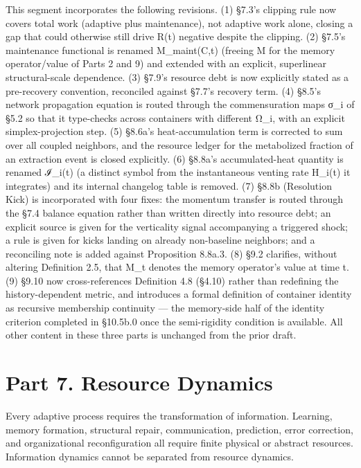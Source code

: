 \documentclass[
]{article}
\begin{document}
This segment incorporates the following revisions. (1) §7.3's clipping
rule now covers total work (adaptive plus maintenance), not adaptive
work alone, closing a gap that could otherwise still drive R(t) negative
despite the clipping. (2) §7.5's maintenance functional is renamed
M\_maint(C,t) (freeing M for the memory operator/value of Parts 2 and 9)
and extended with an explicit, superlinear structural-scale dependence.
(3) §7.9's resource debt is now explicitly stated as a pre-recovery
convention, reconciled against §7.7's recovery term. (4) §8.5's network
propagation equation is routed through the commensuration maps σ\_i of
§5.2 so that it type-checks across containers with different Ω\_i, with
an explicit simplex-projection step. (5) §8.6a's heat-accumulation term
is corrected to sum over all coupled neighbors, and the resource ledger
for the metabolized fraction of an extraction event is closed
explicitly. (6) §8.8a's accumulated-heat quantity is renamed ℐ\_i(t) (a
distinct symbol from the instantaneous venting rate H\_i(t) it
integrates) and its internal changelog table is removed. (7) §8.8b
(Resolution Kick) is incorporated with four fixes: the momentum transfer
is routed through the §7.4 balance equation rather than written directly
into resource debt; an explicit source is given for the verticality
signal accompanying a triggered shock; a rule is given for kicks landing
on already non-baseline neighbors; and a reconciling note is added
against Proposition 8.8a.3. (8) §9.2 clarifies, without altering
Definition 2.5, that M\_t denotes the memory operator's value at time t.
(9) §9.10 now cross-references Definition 4.8 (§4.10) rather than
redefining the history-dependent metric, and introduces a formal
definition of container identity as recursive membership continuity ---
the memory-side half of the identity criterion completed in §10.5b.0
once the semi-rigidity condition is available. All other content in
these three parts is unchanged from the prior draft.

\hypertarget{part-7.-resource-dynamics}{%
\section{Part 7. Resource Dynamics}\label{part-7.-resource-dynamics}}

Every adaptive process requires the transformation of information.
Learning, memory formation, structural repair, communication,
prediction, error correction, and organizational reconfiguration all
require finite physical or abstract resources. Information dynamics
cannot be separated from resource dynamics.
\end{document}
